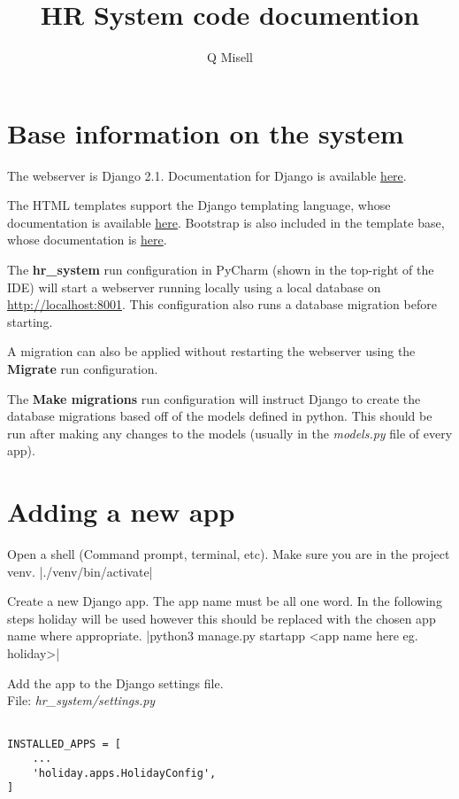 \documentclass[12pt,a4paper]{article}
\author{Q Misell}
\title{HR System code documention}
\begin{document}
\maketitle
\newpage

\tableofcontents
\newpage


\section{Base information on the system}
The webserver is Django 2.1. Documentation for Django is available \href{https://docs.djangoproject.com/en/2.1/}{here}.

The HTML templates support the Django templating language, whose documentation is available \href{https://docs.djangoproject.com/en/2.1/topics/templates/}{here}. Bootstrap is also included in the template base, whose documentation is \href{http://getbootstrap.com/docs/4.1/layout/overview/}{here}.

The \textbf{hr\_system} run configuration in PyCharm (shown in the top-right of the IDE) will start a webserver running locally using a local database on \url{http://localhost:8001}. This configuration also runs a database migration before starting.

A migration can also be applied without restarting the webserver using the \textbf{Migrate} run configuration.

The \textbf{Make migrations} run configuration will instruct Django to create the database migrations based off of the models defined in python. This should be run after making any changes to the models (usually in the \textit{models.py} file of every app).

\section{Adding a new app}
Open a shell (Command prompt, terminal, etc).
Make sure you are in the project venv.
|./venv/bin/activate|

Create a new Django app. The app name must be all one word. In the following steps holiday will be used however this should be replaced with the chosen app name where appropriate.
|python3 manage.py startapp <app name here eg. holiday>|

Add the app to the Django settings file.\\
File: \textit{hr\_system/settings.py}
\begin{verbatim}

INSTALLED_APPS = [
    ...
    'holiday.apps.HolidayConfig',
]
\end{verbatim}
\end{document}
